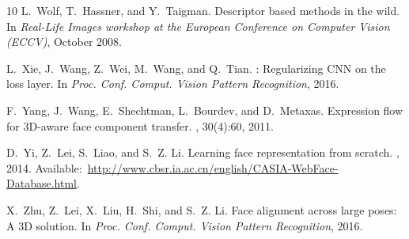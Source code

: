 \documentclass[10pt,twocolumn,letterpaper]{article}
\begin{document}
{\begin{thebibliography}{10}
L.~Wolf, T.~Hassner, and Y.~Taigman.
\newblock Descriptor based methods in the wild.
\newblock In {\em Real-Life Images workshop at the European Conference on
  Computer Vision (ECCV)}, October 2008.

L.~Xie, J.~Wang, Z.~Wei, M.~Wang, and Q.~Tian.
: Regularizing {CNN} on the loss layer.
\newblock In {\em Proc. Conf. Comput. Vision Pattern Recognition}, 2016.

F.~Yang, J.~Wang, E.~Shechtman, L.~Bourdev, and D.~Metaxas.
\newblock Expression flow for {3D}-aware face component transfer.
, 30(4):60, 2011.

D.~Yi, Z.~Lei, S.~Liao, and S.~Z. Li.
\newblock Learning face representation from scratch.
, 2014.
\newblock
  Available:~\url{http://www.cbsr.ia.ac.cn/english/CASIA-WebFace-Database.html}.

X.~Zhu, Z.~Lei, X.~Liu, H.~Shi, and S.~Z. Li.
\newblock Face alignment across large poses: A {3D} solution.
\newblock In {\em Proc. Conf. Comput. Vision Pattern Recognition}, 2016.

\end{thebibliography}

}
 
\end{document}
